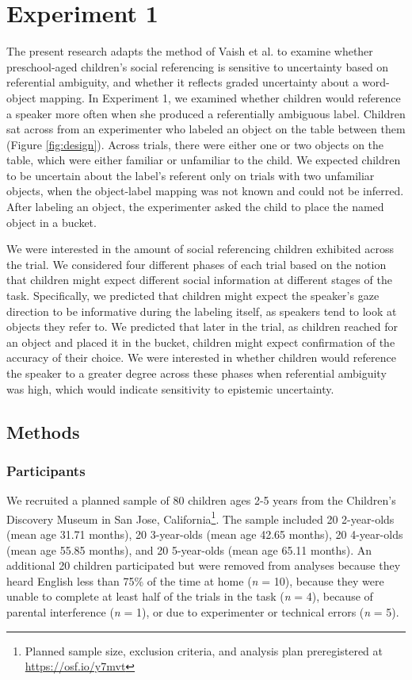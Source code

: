 \documentclass[10pt, letterpaper]{article}
\begin{document}
\section{Experiment 1}\label{experiment-1}

The present research adapts the method of Vaish et al. to examine
whether preschool-aged children's social referencing is sensitive to
uncertainty based on referential ambiguity, and whether it reflects
graded uncertainty about a word-object mapping. In Experiment 1, we
examined whether children would reference a speaker more often when she
produced a referentially ambiguous label. Children sat across from an
experimenter who labeled an object on the table between them (Figure
\ref{fig:design}). Across trials, there were either one or two objects
on the table, which were either familiar or unfamiliar to the child. We
expected children to be uncertain about the label's referent only on
trials with two unfamiliar objects, when the object-label mapping was
not known and could not be inferred. After labeling an object, the
experimenter asked the child to place the named object in a bucket.

We were interested in the amount of social referencing children
exhibited across the trial. We considered four different phases of each
trial based on the notion that children might expect different social
information at different stages of the task. Specifically, we predicted
that children might expect the speaker's gaze direction to be
informative during the labeling itself, as speakers tend to look at
objects they refer to. We predicted that later in the trial, as children
reached for an object and placed it in the bucket, children might expect
confirmation of the accuracy of their choice. We were interested in
whether children would reference the speaker to a greater degree across
these phases when referential ambiguity was high, which would indicate
sensitivity to epistemic uncertainty.

\subsection{Methods}\label{methods}

\subsubsection{Participants}\label{participants}

We recruited a planned sample of 80 children ages 2-5 years from the
Children's Discovery Museum in San Jose, California\footnote{Planned
  sample size, exclusion criteria, and analysis plan preregistered at
  \url{https://osf.io/y7mvt}}. The sample included 20 2-year-olds (mean
age 31.71 months), 20 3-year-olds (mean age 42.65 months), 20
4-year-olds (mean age 55.85 months), and 20 5-year-olds (mean age 65.11
months). An additional 20 children participated but were removed from
analyses because they heard English less than 75\% of the time at home
(\emph{n} = 10), because they were unable to complete at least half of
the trials in the task (\emph{n} = 4), because of parental interference
(\emph{n} = 1), or due to experimenter or technical errors (\emph{n} =
5).
\end{document}
